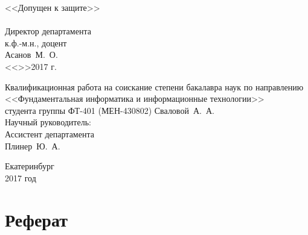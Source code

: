 \documentclass[12pt]{report}
\begin{document}
{		\hspace{-1cm}
		\begin{minipage}{80mm}
			\noindent
			\vspace{-2.3cm}
			\begin{flushleft}
				\begin{spacing}{1.0}
					\large <<Допущен к защите>>\\
					\hspace{6cm}\\
					\large Директор департамента\\
					\large к.ф.-м.н., доцент\\
					\large Асанов~М.~О.
					\underline{\hspace{6cm}}\\
					<<\underline{\hspace{0.7cm}}>>\underline{\hspace{3cm}}2017 г.
				\end{spacing}
			\end{flushleft}
		\end{minipage}
		\begin{minipage}{90mm}
			\begin{flushleft}
				\begin{spacing}{1.0}
					\large Квалификационная работа на соискание степени бакалавра наук по направлению\\
					\large <<Фундаментальная информатика и информационные технологии>>\\
					\large студента группы ФТ-401 (МЕН-430802) Сваловой~А.~А.\\
					\large Научный руководитель:\\
					\large Ассистент департамента\\
					\large Плинер~Ю.~А.
				\end{spacing}
			\end{flushleft}
		\end{minipage}
		
		\vfill
		
		\begin{center}
			Екатеринбург\\
			2017 год
		\end{center}
	}
	
	\newpage
	
	{\pagestyle{plain}
		\tableofcontents
	}
	
	\newpage
	
	\chapter*{Реферат}
	
\end{document}
